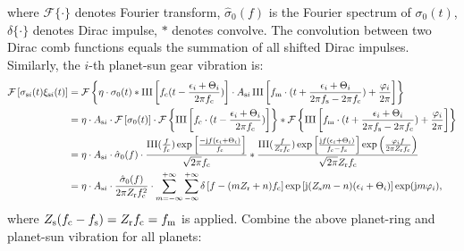 \documentclass[a4paper,fleqn]{cas-sc}%
\begin{document}
where $\mathcal{F}\{\cdot\}$ denotes Fourier transform, $\hat{\sigma}_0(f)$ is the Fourier spectrum of $\sigma_0(t)$, $\delta\{\cdot\}$ denotes Dirac impulse, $\ast$ denotes convolve. The convolution between two Dirac comb functions equals the summation of all shifted Dirac impulses. Similarly,  the $i$-th planet-sun gear vibration is:
\begin{equation}
    \begin{split}
        \mathcal{F}\left[\sigma_{{\rm s}i}(t) \xi_{{\rm s}i}(t)\right]&=\mathcal{F}\left\{ \eta \cdot \sigma_0(t) \ast \operatorname{III}\left[f_{\rm c}(t-\frac{\epsilon_i+\Theta_i}{2 \pi f_{\rm c}})\right] \cdot A_{{\rm s}i} \operatorname{III} \left[ f_{\rm m} \cdot (t+ \frac{\epsilon_i+\Theta_i}{2\pi f_{\rm s} -2\pi f_{\rm c}} ) +\frac{\varphi_i}{2\pi} \right] \right\}\\
        &=\eta \cdot A_{{\rm s}i} \cdot \mathcal{F}\left[\sigma_0(t)\right] \cdot \mathcal{F}\left\{ \operatorname{III}\left[f_{\rm c} \cdot (t-\frac{\epsilon_i+\Theta_i}{2\pi f_{\rm c}}) \right] \right\} \ast \mathcal{F}\left\{\operatorname{III} \left[ f_{\rm m} \cdot (t+ \frac{\epsilon_i+\Theta_i}{2\pi f_{\rm s} -2\pi f_{\rm c}} ) +\frac{\varphi_i}{2\pi} \right]\right\}\\
        &=\eta \cdot A_{{\rm s}i} \cdot \hat{\sigma}_0(f) \cdot \frac{\operatorname{III}(\frac{f}{f_{\rm c}}) \exp\left[\frac{-{\rm j}f(\epsilon_i+\Theta_i)}{f_{\rm c}}\right]}{\sqrt{2 \pi} f_{\rm c}} \ast \frac{\operatorname{III}(\frac{f}{Z_{\rm r}f_{\rm c}})\exp\left[\frac{{\rm j}f(\epsilon_i+\Theta_i)}{f_{\rm c}-f_{\rm s}}\right] \exp\left(\frac{\varphi_i f}{2\pi Z_{\rm r} f_{\rm c} } \right)}{\sqrt{2 \pi }Z_{\rm r} f_{\rm c}}\\
        &=\eta \cdot A_{{\rm s}i} \cdot \frac{\hat{\sigma}_0(f)}{2 \pi  Z_{\rm r} f_{\rm c}^2} \cdot \sum_{m=-\infty}^{+\infty} \sum_{-\infty}^{+\infty} \delta\left[f-(m Z_{\rm r}+ n)f_{\rm c} \right] \exp\left[ {\rm j} (Z_{\rm s} m - n)(\epsilon_i+\Theta_i) \right] \exp({\rm j}m \varphi_i),
    \end{split}
\end{equation}
where $Z_{\rm s}  (f_{\rm c} -f_{\rm s})= Z_{\rm r} f_{\rm c} =f_{\rm m}$ is applied. Combine the above planet-ring and planet-sun vibration for all planets:
\end{document}
